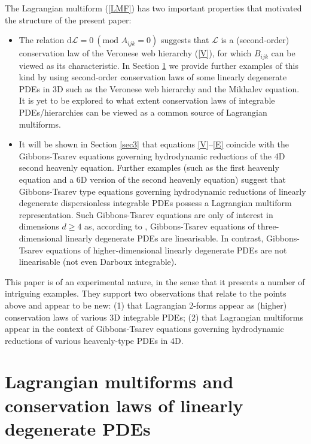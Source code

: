 \documentclass[12pt, a4paper]{article}
\theoremstyle{definition}
\renewcommand{\d}{\mathrm{d}}
\newcommand{\cL}{\mathcal{L}}
\begin{document}
The Lagrangian multiform (\ref{LMF}) has two important properties that motivated the structure of the present paper:

\begin{itemize}
	\item The relation $\d \cL=0 \ (\text{mod }A_{ijk}=0)$ suggests that $\cL$ is a (second-order) conservation law of the Veronese web hierarchy (\ref{V}), for which $B_{ijk}$ can be viewed as its characteristic. In Section \ref{sec2} we provide further examples of this kind  by using second-order conservation laws of some linearly degenerate PDEs in 3D such as the Veronese web hierarchy and the Mikhalev equation. It is yet to be explored to what extent conservation laws of integrable PDEs/hierarchies can be viewed as a common source of Lagrangian multiforms.
	
	\item It will be shown in Section \ref{sec3} that equations \eqref{V}--\eqref{E} coincide with the Gibbons-Tsarev equations governing hydrodynamic reductions of the 4D second heavenly equation. Further examples (such as  the first heavenly equation and a 6D version of the second heavenly equation) suggest that Gibbons-Tsarev type equations governing hydrodynamic reductions of linearly degenerate dispersionless integrable PDEs possess a Lagrangian multiform representation. Such Gibbons-Tsarev equations are only of interest in dimensions $d\geq 4$ as, according to \cite{odesskii2009systems}, Gibbons-Tsarev equations of three-dimensional linearly degenerate PDEs are linearisable. In contrast, Gibbons-Tsarev equations of higher-dimensional linearly degenerate PDEs are not linearisable (not even Darboux integrable).	
	 
\end{itemize}

This paper is of an experimental nature, in the sense that it presents a number of intriguing examples. They support two observations that relate to the points above and appear to be new:
(1) that Lagrangian 2-forms appear as (higher) conservation laws of various 3D integrable PDEs;
(2) that Lagrangian multiforms appear in the context of  Gibbons-Tsarev equations governing hydrodynamic reductions of various heavenly-type PDEs in 4D.




\section{Lagrangian multiforms and conservation laws of linearly degenerate PDEs}
\label{sec2}
\end{document}
